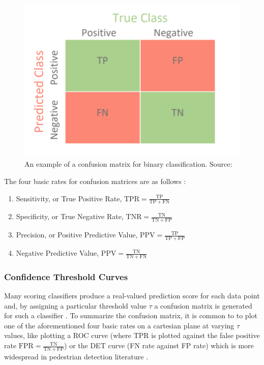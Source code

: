 \begin{figure}
    \centering
    \includegraphics[width=0.5\linewidth]{images/conf_matrix.png}
    \caption{An example of a confusion matrix for binary classification. Source: \cite{conf_matrix}}
    \label{fig:conf_matrix}
\end{figure}

The four basic rates for confusion matrices are as follows \cite{chicco_eval_2023}:
\begin{enumerate}
    \item Sensitivity, or True Positive Rate, $\mathrm{TPR}=\frac{\mathrm{TP}}{\mathrm{TP}+\mathrm{FN}}$

    \item Specificity, or True Negative Rate, $\mathrm{TNR}=\frac{\mathrm{TN}}{\mathrm{TN}+\mathrm{FP}}$
    
    \item Precision, or Positive Predictive Value, $\mathrm{PPV}=\frac{\mathrm{TP}}{\mathrm{TP}+\mathrm{FP}}$
    
    \item Negative Predictive Value, $\mathrm{PPV}=\frac{\mathrm{TN}}{\mathrm{TN}+\mathrm{FN}}$
\end{enumerate} 

\subsubsection{Confidence Threshold Curves}

Many scoring classifiers produce a real-valued prediction score for each data point and, by assigning a particular threshold value $\tau$ a confusion matrix is generated for such a classifier \cite{chicco_jurman_2020_mcc_f1}. To summarize the confusion matrix, it is common to to plot one of the aforementioned four basic rates on a cartesian plane at varying $\tau$ values, like plotting a ROC curve (where TPR is plotted against the false positive rate $\mathrm{FPR}=\frac{\mathrm{TN}}{\mathrm{TN}+\mathrm{FP}}$) or the DET curve (FN rate against FP rate) which is more widespread in pedestrian detection literature \cite{dalal_2005_histograms} \cite{dollar_2012_pedestrian}. 

